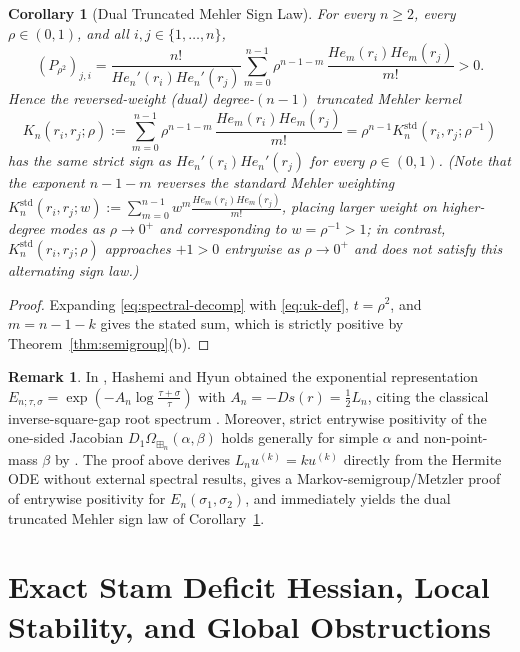 \documentclass[11pt,a4paper]{article}
\newtheorem{corollary}[theorem]{Corollary}
\theoremstyle{definition}
\newtheorem{remark}[theorem]{Remark}
\newcommand{\boxplusn}{\boxplus_n}
\begin{document}
\begin{corollary}[Dual Truncated Mehler Sign Law]
\label{cor:mehler}
For every $n \ge 2$, every $\rho \in (0, 1)$, and all $i, j \in \{1, \dots, n\}$,
\[
(P_{\rho^2})_{j,i} = \frac{n!}{He_n'(r_i) He_n'(r_j)} \sum_{m=0}^{n-1} \rho^{n-1-m}\,\frac{He_m(r_i) He_m(r_j)}{m!} > 0.
\]
Hence the reversed-weight (dual) degree-$(n-1)$ truncated Mehler kernel
\[
K_n(r_i, r_j; \rho) := \sum_{m=0}^{n-1} \rho^{n-1-m}\,\frac{He_m(r_i) He_m(r_j)}{m!} = \rho^{n-1} K_n^{\mathrm{std}}(r_i, r_j; \rho^{-1})
\]
has the same strict sign as $He_n'(r_i) He_n'(r_j)$ for every $\rho \in (0,1)$. (Note that the exponent $n-1-m$ reverses the standard Mehler weighting $K_n^{\mathrm{std}}(r_i, r_j; w) := \sum_{m=0}^{n-1} w^m \frac{He_m(r_i) He_m(r_j)}{m!}$, placing larger weight on higher-degree modes as $\rho \to 0^+$ and corresponding to $w = \rho^{-1} > 1$; in contrast, $K_n^{\mathrm{std}}(r_i, r_j; \rho)$ approaches $+1 > 0$ entrywise as $\rho \to 0^+$ and does not satisfy this alternating sign law.)
\end{corollary}

\begin{proof}
Expanding \eqref{eq:spectral-decomp} with \eqref{eq:uk-def}, $t = \rho^2$, and $m = n-1-k$ gives the stated sum, which is strictly positive by Theorem~\ref{thm:semigroup}(b).
\end{proof}

\begin{remark}
In \cite[Appendix~A, eqs.~(113)--(114)]{HH2026}, Hashemi and Hyun obtained the exponential representation $E_{n;\tau,\sigma} = \exp(-A_n \log\frac{\tau+\sigma}{\tau})$ with $A_n = -Ds(r) = \frac{1}{2}L_n$, citing the classical inverse-square-gap root spectrum \cite[\S4.1]{Sasaki15}. Moreover, strict entrywise positivity of the one-sided Jacobian $D_1\Omega_{\boxplusn}(\alpha,\beta)$ holds generally for simple $\alpha$ and non-point-mass $\beta$ by \cite[Theorem~5.1]{HH2026}. The proof above derives $L_n u^{(k)} = k u^{(k)}$ directly from the Hermite ODE without external spectral results, gives a Markov-semigroup/Metzler proof of entrywise positivity for $E_n(\sigma_1,\sigma_2)$, and immediately yields the dual truncated Mehler sign law of Corollary~\ref{cor:mehler}.
\end{remark}

\section{Exact Stam Deficit Hessian, Local Stability, and Global Obstructions}
\end{document}
